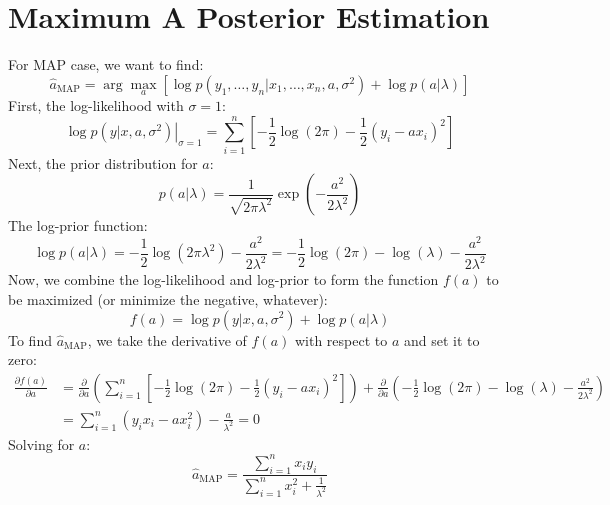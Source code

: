 \documentclass[11pt, a4paper, oneside]{memoir}
\begin{document}
\section{Maximum A Posterior Estimation}
For MAP case, we want to find:
\[ \hat{a}_{\text{MAP}} = \arg \max_a \left[ \log p(y_1, \dots, y_n | x_1, \dots, x_n, a, \sigma^2) + \log p(a | \lambda) \right] \]
First, the log-likelihood with $\sigma=1$:
\[ \left. \log p(y | x, a, \sigma^2) \right|_{\sigma=1} = \sum_{i=1}^n \left[ -\frac{1}{2} \log(2\pi) - \frac{1}{2} (y_i - ax_i)^2 \right] \]
Next, the prior distribution for $a$:
\[ p(a | \lambda) = \frac{1}{\sqrt{2\pi\lambda^2}} \exp\left( -\frac{a^2}{2\lambda^2} \right) \]
The log-prior function:
\[ \log p(a | \lambda) = -\frac{1}{2} \log(2\pi\lambda^2) - \frac{a^2}{2\lambda^2} = -\frac{1}{2} \log(2\pi) - \log(\lambda) - \frac{a^2}{2\lambda^2} \]
Now, we combine the log-likelihood and log-prior to form the function $f(a)$ to be maximized (or minimize the negative, whatever):
\[ f(a) = \log p(y | x, a, \sigma^2) + \log p(a | \lambda) \]
To find $\hat{a}_{\text{MAP}}$, we take the derivative of $f(a)$ with respect to $a$ and set it to zero:
\begin{align*}
\frac{\partial f(a)}{\partial a} &= \frac{\partial}{\partial a} \left( \sum_{i=1}^n \left[ -\frac{1}{2} \log(2\pi) - \frac{1}{2} (y_i - ax_i)^2 \right] \right) + \frac{\partial}{\partial a} \left( -\frac{1}{2} \log(2\pi) - \log(\lambda) - \frac{a^2}{2\lambda^2} \right) \\
&= \sum_{i=1}^n (y_i x_i - ax_i^2) - \frac{a}{\lambda^2} = 0
\end{align*}
Solving for $a$:
\[ \hat{a}_{\text{MAP}} = \frac{\sum_{i=1}^n x_i y_i}{\sum_{i=1}^n x_i^2 + \frac{1}{\lambda^2}} \]
\end{document}
